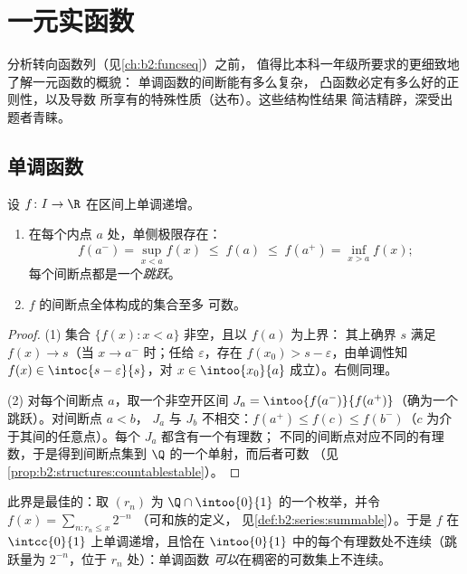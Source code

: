 \chapter{一元实函数}\label{ch:b2:realfun}

分析转向函数列（见\cref{ch:b2:funcseq}）之前，
值得比本科一年级所要求的更细致地了解一元函数的概貌：
单调函数的间断能有多么复杂，
凸函数必定有多么好的正则性，以及导数
所享有的特殊性质（达布）。这些结构性结果
简洁精辟，深受出题者青睐。

\section{单调函数}

\begin{theorem}[单调函数的正则性]\label{thm:b2:realfun:monotone}
设 $f \colon I \to \R$ 在区间上单调递增。
\begin{enumerate}
  \item 在每个内点 $a$ 处，单侧极限存在：
        \[
        f(a^-) = \sup_{x < a} f(x) \;\leq\; f(a) \;\leq\;
        f(a^+) = \inf_{x > a} f(x) ;
        \]
        每个间断点都是一个\emph{跳跃}。
  \item $f$ 的间断点全体构成的集合至多
        可数。
\end{enumerate}
\end{theorem}

\begin{proof}
(1) 集合 $\{f(x) : x < a\}$ 非空，且以 $f(a)$ 为上界：
其上确界 $s$ 满足 $f(x) \to s$（当 $x \to a^-$ 时；任给
$\varepsilon$，存在 $f(x_0) > s - \varepsilon$，由单调性知
$f(x) \in \intoc{s - \varepsilon}{s}$，对 $x \in
\intoo{x_0}{a}$ 成立）。右侧同理。

(2) 对每个间断点 $a$，取一个非空开区间
$J_a = \intoo{f(a^-)}{f(a^+)}$（确为一个跳跃）。对间断点 $a < b$，
$J_a$ 与 $J_b$ 不相交：$f(a^+) \leq f(c)
\leq f(b^-)$（$c$ 为介于其间的任意点）。每个 $J_a$ 都含有一个有理数；
不同的间断点对应不同的有理数，于是得到间断点集到
$\Q$ 的一个单射，而后者可数
（见\cref{prop:b2:structures:countablestable}）。
\end{proof}

\begin{example}
此界是最佳的：取 $(r_n)$ 为 $\Q \cap
\intoo{0}{1}$ 的一个枚举，并令 $f(x) = \sum_{n : r_n \leq x} 2^{-n}$
（可和族的定义，
见\cref{def:b2:series:summable}）。于是 $f$ 在
$\intcc{0}{1}$ 上单调递增，且恰在
$\intoo{0}{1}$ 中的每个有理数处不连续（跳跃量为 $2^{-n}$，位于 $r_n$ 处）：单调函数
\emph{可以}在稠密的可数集上不连续。
\end{example}

